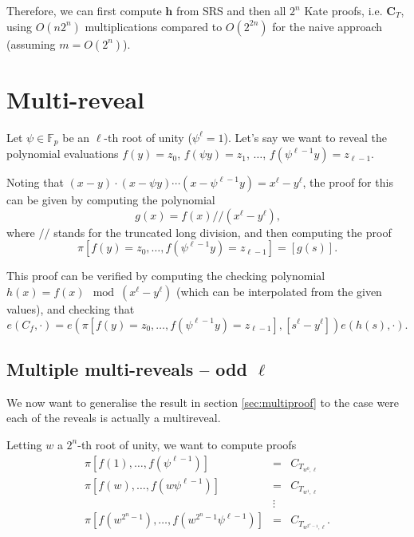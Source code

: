 \documentclass[a4paper]{article}
\begin{document}
Therefore, we can first compute $\mathbf{h}$ from SRS and then all  $2^n$ Kate proofs, i.e. $\mathbf{C}_T$, using $O(n2^n)$ multiplications compared to $O(2^{2n})$ for the naive approach (assuming $m = O(2^n)$).

\section{Multi-reveal}

Let $\psi\in\mathbb{F}_p$ be an $\ell$-th root of unity ($\psi^\ell=1$). Let's say we want to reveal the polynomial evaluations $f(y) = z_0$, $f(\psi y) = z_1$, $\ldots$, $f(\psi^{\ell-1} y)=z_{\ell - 1}$.

Noting that $(x-y)\cdot(x-\psi y) \cdots (x - \psi^{\ell-1} y) = x^\ell - y^\ell$, the proof for this can be given by computing the polynomial
\begin{equation}
g(x) = f(x) // (x^\ell - y^\ell)\text{,}
\end{equation}
where $//$ stands for the truncated long division, and then computing the proof
\begin{equation}
     \pi[f(y) = z_0, \ldots, f(\psi^{\ell-1}y)=z_{\ell - 1}] = [g(s)] \text{.}
\end{equation}

This proof can be verified by computing the checking polynomial $h(x) = f(x) \mod (x^\ell - y^\ell)$ (which can be interpolated from the given values), and checking that
\begin{equation}
e(C_f, \cdot) = e(\pi[f(y) = z_0, \ldots, f(\psi^{\ell-1}y)=z_{\ell - 1}], [s^\ell - y^\ell]) e(h(s),\cdot) \text{.}
\end{equation}

\subsection{Multiple multi-reveals -- odd $\ell$}

We now want to generalise the result in section \ref{sec:multiproof} to the case were each of the reveals is actually a multireveal.

Letting $w$ a $2^n$-th root of unity, we want to compute proofs
\begin{eqnarray}
     \pi[f(1), \ldots, f(\psi^{\ell-1})] &=& C_{T_{w^0, \ell}} \\
     \pi[f(w), \ldots, f(w\psi^{\ell-1})] &=& C_{T_{w^1, \ell}} \\
     &\vdots& \nonumber \\
     \pi[f(w^{2^n-1}), \ldots, f(w^{2^n-1}\psi^{\ell-1})] &=& C_{T_{w^{2^n-1}, \ell}} \text{.}
\end{eqnarray}
\end{document}
